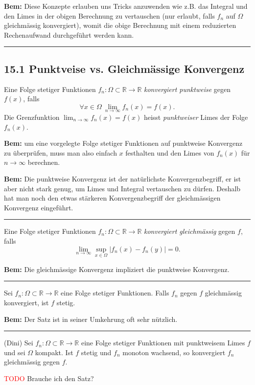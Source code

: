 \documentclass[a4paper,landscape,8pt]{extarticle}
\newcommand{\R}{\mathbb{R}}
\newcommand{\abs}[1]{\left\lvert #1 \right\rvert}
\newcommand{\todo}{\textcolor{red}{TODO }}
\newcommand{\sep}{\vspace{5pt}\noindent\hrule\vspace{5pt}}
\newcommand{\Bem}{\textbf{Bem: }}
\begin{document}
\begin{multicols*}{4}
\Bem Diese Konzepte erlauben uns Tricks anzuwenden wie z.B. das Integral und den
Limes in der obigen Berechnung zu vertauschen (nur erlaubt, falls $f_n$ auf
$\Omega$ gleichmässig konvergiert), womit die obige Berechnung mit einem
reduzierten Rechenaufwand durchgeführt werden kann.

\sep

\subsection{15.1 Punktveise vs. Gleichmässige Konvergenz}

\Def Eine Folge stetiger Funktionen $f_n\colon\Omega\subset\R\to\R$
\emph{konvergiert punktweise} gegen $f(x)$, falls
\[
\forall x\in\Omega \ \lim_{n\to\infty} f_n(x) = f(x).
\]
Die Grenzfunktion $\lim_{n\to\infty} f_n(x) = f(x)$ heisst \emph{punktweiser}
Limes der Folge $f_n(x)$.

\Bem um eine vorgelegte Folge stetiger Funktionen auf punktweise Konvergenz zu
überprüfen, muss man also einfach $x$ festhalten und den Limes von $f_n(x)$ für
$n\to\infty$ berechnen.

\Bem Die punktweise Konvergenz ist der natürlichste Konvergenzbegriff, er ist
aber nicht stark genug, um Limes und Integral vertauschen zu dürfen. Deshalb hat
man noch den etwas stärkeren Konvergenzbegriff der gleichmässigen Konvergenz
eingeführt.

\sep

\Def Eine Folge stetiger Funktionen $f_n\colon\Omega\subset\R\to\R$
\emph{konvergiert gleichmässig} gegen $f$, falls
\[
\lim_{n\to\infty} \sup_{x\in\Omega} \abs{f_n(x)-f_n(y)} = 0.
\]

\Bem Die gleichmässige Konvergenz impliziert die punktweise Konvergenz.

\sep

\Satz Sei $f_n\colon\Omega\subset\R\to\R$ eine Folge stetiger Funktionen. Falls
$f_n$ gegen $f$ gleichmässig konvergiert, ist $f$ stetig.

\Bem Der Satz ist in seiner Umkehrung oft sehr nützlich.

\sep

\Satz (Dini) Sei $f_n\colon\Omega\subset\R\to\R$ eine Folge stetiger Funktionen
mit punktweisem Limes $f$ und sei $\Omega$ kompakt. Ist $f$ stetig und $f_n$
monoton wachsend, so konvergiert $f_n$ gleichmässig gegen $f$.

\begin{warmup}
\todo Brauche ich den Satz?
\end{warmup}



\end{multicols*}
\end{document}
